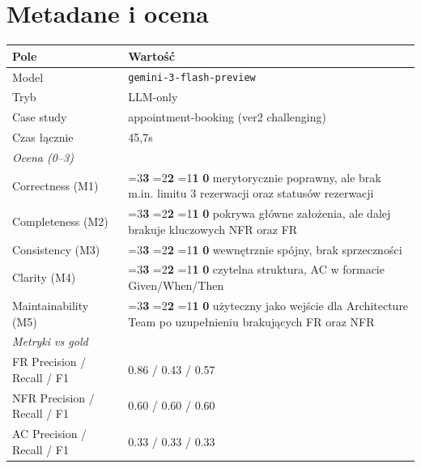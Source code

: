 \documentclass[12pt,a4paper]{article}
\newcommand{\scorebox}[1]{%
  \ifnum#1=3\colorbox{score3}{\textbf{3}}%
  \else\ifnum#1=2\colorbox{score2}{\textbf{2}}%
  \else\ifnum#1=1\colorbox{score1}{\textbf{1}}%
  \else\colorbox{score0}{\textbf{0}}\fi\fi\fi
}
\begin{document}
\section{Metadane i ocena}
\begin{table}[h]
\begin{tabularx}{\textwidth}{l X}
\toprule
\textbf{Pole} & \textbf{Wartość} \\
\midrule
Model & \texttt{gemini-3-flash-preview} \\
Tryb & LLM-only \\
Case study & appointment-booking (ver2 challenging) \\
Czas łącznie & 45,7s \\
\midrule
\multicolumn{2}{l}{\textit{Ocena (0--3)}} \\
\midrule
Correctness (M1)     & \scorebox{2} \quad merytorycznie poprawny, ale brak m.in. limitu 3 rezerwacji oraz statusów rezerwacji \\
Completeness (M2)    & \scorebox{1} \quad pokrywa główne założenia, ale dalej brakuje kluczowych NFR oraz FR \\
Consistency (M3)     & \scorebox{3} \quad wewnętrznie spójny, brak sprzeczności \\
Clarity (M4)         & \scorebox{3} \quad czytelna struktura, AC w formacie Given/When/Then \\
Maintainability (M5) & \scorebox{2} \quad użyteczny jako wejście dla Architecture Team po uzupełnieniu brakujących FR oraz NFR \\
\midrule
\multicolumn{2}{l}{\textit{Metryki vs gold}} \\
\midrule
FR Precision / Recall / F1   & 0.86 / 0.43 / 0.57 \\
NFR Precision / Recall / F1  & 0.60 / 0.60 / 0.60 \\
AC Precision / Recall / F1   & 0.33 / 0.33 / 0.33 \\
\bottomrule
\end{tabularx}
\end{table}
\end{document}
